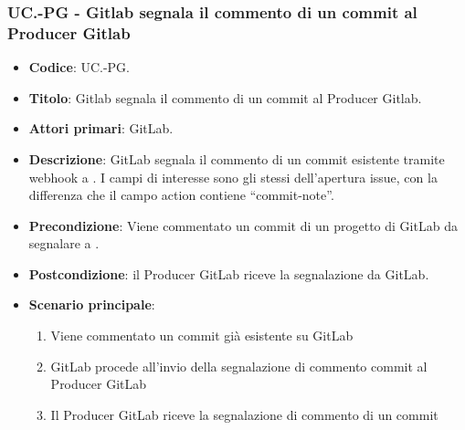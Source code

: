 \subsubsection{UC\theuccount.\thesubuccount-PG - Gitlab segnala il commento di un commit al Producer Gitlab}
\begin{itemize}
    \item \textbf{Codice}: UC\theuccount.\thesubuccount-PG.
    \item \textbf{Titolo}: Gitlab segnala il commento di un commit al Producer Gitlab.
    \item \textbf{Attori primari}: GitLab.
    \item \textbf{Descrizione}: GitLab segnala il commento di un commit esistente tramite webhook a \progetto.
    I campi di interesse sono gli stessi dell'apertura issue, con la differenza che il campo action contiene ``commit-note''.
    \item \textbf{Precondizione}: Viene commentato un commit di un progetto di GitLab da segnalare a \progetto.
    \item \textbf{Postcondizione}: il Producer GitLab riceve la segnalazione da GitLab.
    \item \textbf{Scenario principale}:
    \begin{enumerate}
        \item Viene commentato un commit già esistente su GitLab
        \item GitLab procede all'invio della segnalazione di commento commit al Producer GitLab
        \item Il Producer GitLab riceve la segnalazione di commento di un commit
    \end{enumerate}

\end{itemize}
